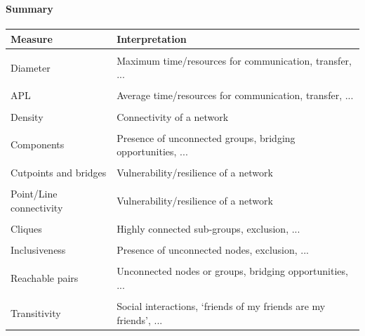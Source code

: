 \documentclass[8pt]{beamer}
\begin{document}
\begin{frame}
\frametitle{\insertsection}
\framesubtitle{Summary}

\footnotesize
\centering
\begin{tabular}{p{3cm}p{7.5cm}}
\toprule
\textbf{Measure} & \textbf{Interpretation}\\
\hline
\\
Diameter                        & Maximum time/resources for communication, transfer, ...\\
\\
APL                             & Average time/resources for communication, transfer, ...\\
\\
Density                         & Connectivity of a network \\
\\
Components                      & Presence of unconnected groups, bridging opportunities, ... \\
\\
Cutpoints and bridges           & Vulnerability/resilience of a network\\
\\
Point/Line connectivity         & Vulnerability/resilience of a network\\
\\
Cliques                         & Highly connected sub-groups, exclusion, ...\\
\\
Inclusiveness                   & Presence of unconnected nodes, exclusion, ... \\    
\\
Reachable pairs                 & Unconnected nodes or groups, bridging opportunities, ... \\
\\
Transitivity                    & Social interactions, `friends of my friends are my friends', ... \\

\bottomrule
\end{tabular}

\end{frame}


\bgroup
{}
\begin{frame}[plain]{}
\begin{center}
\color{white}{\Huge Questions}
\end{center}
\end{frame}
\egroup
  
\end{document}
